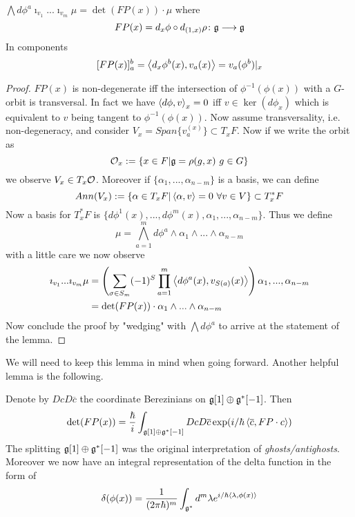 \begin{lem}
  $\bigwedge d\phi^a \imath_{v_1} ... \imath_{v_m} \mu = \det(FP(x)) \cdot \mu$ where
  $$FP(x) = d_x \phi \circ d_{(1,x)} \rho \colon \gf \lra \gf$$
  In components
  $$ [FP(x)]^b_a = \pair{d_x\phi^b(x)}{v_a(x)} = v_a (\phi^b)|_x $$
\begin{proof}
  $FP(x)$ is non-degenerate iff the intersection of $\phi^{-1}(\phi(x))$ with a $G$-orbit is transversal. In fact we have $\pair{d\phi}{v}_x = 0$ iff $v \in \ker(d\phi_x)$ which is equivalent to $v$ being tangent to $\phi^{-1}(\phi(x))$. Now assume transversality, i.e. non-degeneracy, and consider $V_x = Span\{v_a^{(x)}\} \subset T_x F$. Now if we write the orbit as
  $$ \mathcal{O}_x := \{x \in F | \mathfrak{g} = \rho(g,x) \ g \in G \} $$
  we observe $V_x \in T_x \mathcal{O}$. Moreover if $\{\alpha_1, ..., \alpha_{n-m}\}$ is a basis, we can define
  $$ Ann(V_x) := \{ \alpha \in T_x F | \left\langle \alpha , v \right\rangle = 0 \ \forall v \in V \} \subset T^*_x F$$
  Now a basis for $T^*_x F$ is $\{d\phi^1(x), ..., d\phi^m(x), \alpha_1, ..., \alpha_{n-m} \}$. Thus we define
  $$ \mu = \bigwedge_{a=1}^m d\phi^a  \wedge \alpha_1 \wedge ... \wedge \alpha_{n-m}$$
  with a little care we now observe
  \begin{align*}
    \imath_{v_1} ... \imath_{v_m} \mu &= \left( \sum_{\sigma \in S_m} (-1)^S \prod_{a = 1}^m \pair{d\phi^a(x)}{v_{S(a)}(x)} \right) \alpha_1, ..., \alpha_{n-m}\\
    &= \det(FP(x)) \cdot \alpha_1 \wedge ... \wedge \alpha_{n-m}
  \end{align*}
  Now conclude the proof by "wedging" with $\bigwedge d\phi^a$ to arrive at the statement of the lemma.
\end{proof}
\end{lem}

We will need to keep this lemma in mind when going forward. Another helpful lemma is the following.

\begin{lem}
  Denote by $Dc D\overline{c}$ the coordinate Berezinians on $\mathfrak{g}[1] \oplus \mathfrak{g}^*[-1]$. Then
  $$ \det(FP(x)) = \frac{\hbar}{i} \int_{\mathfrak{g}[1] \oplus \mathfrak{g}^*[-1]} DcD\overline{c} \exp(i/\hbar \left\langle \overline{c} , FP \cdot c \right\rangle)$$
  The splitting $\mathfrak{g}[1] \oplus \mathfrak{g}^*[-1]$ was the original interpretation of \emph{ghosts/antighosts}. Moreover we now have an integral representation of the delta function in the form of
  $$ \delta(\phi(x)) = \frac{1}{(2\pi\hbar)^m} \int_{\gf^*} d^m \lambda e^{i/\hbar \pair{\lambda}{\phi(x)}} $$
\end{lem}

